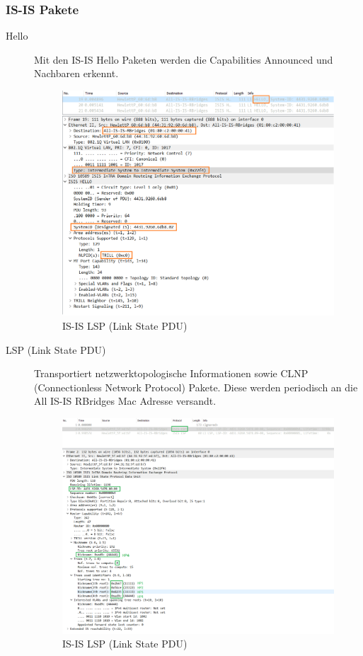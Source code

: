 \subsubsection{IS-IS Pakete}
\begin{description}
	\item[Hello] Mit den IS-IS Hello Paketen werden die Capabilities Announced und Nachbaren erkennt.
	\begin{figure}[h]
		\centering
		\includegraphics[width=\linewidth]{images/is_is_hello}
		\caption{IS-IS LSP (Link State PDU)}
		\label{fig:isislinkstatepdu}
	\end{figure}
	\item[LSP (Link State PDU)] Transportiert netzwerktopologische Informationen sowie CLNP (Connectionless Network Protocol) Pakete. Diese werden periodisch an die All IS-IS RBridges Mac Adresse versandt.
	\begin{figure}[h]
		\centering
		\includegraphics[width=\linewidth]{images/is_is_link_state_pdu}
		\caption{IS-IS LSP (Link State PDU)}
		\label{fig:isislinkstatepdu}
	\end{figure}
\end{description}

